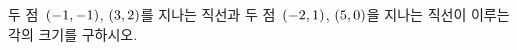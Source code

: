 두 점~$(-1{,}\mkern3mu\mathopen{}-1)$, $(3{,}\mkern3mu\mathopen{}2)$를 지나는 직선과 두 점~$(-2{,}\mkern3mu\mathopen{}1)$, $(5{,}\mkern3mu\mathopen{}0)$을 지나는 직선이 이루는 각의 크기를 구하시오.

